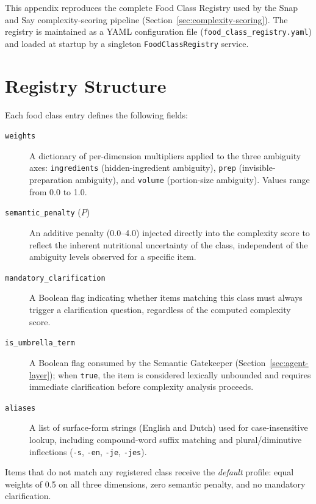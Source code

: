 \label{app:food-class-registry}

This appendix reproduces the complete Food Class Registry used by the Snap and Say complexity-scoring pipeline (Section~\ref{sec:complexity-scoring}). The registry is maintained as a YAML configuration file (\texttt{food\_class\_registry.yaml}) and loaded at startup by a singleton \texttt{FoodClassRegistry} service.

\section*{Registry Structure}

Each food class entry defines the following fields:

\begin{description}
    \item[\texttt{weights}] A dictionary of per-dimension multipliers applied to the three ambiguity axes: \texttt{ingredients} (hidden-ingredient ambiguity), \texttt{prep} (invisible-preparation ambiguity), and \texttt{volume} (portion-size ambiguity). Values range from 0.0 to 1.0.
    \item[\texttt{semantic\_penalty} ($P$)] An additive penalty (0.0--4.0) injected directly into the complexity score to reflect the inherent nutritional uncertainty of the class, independent of the ambiguity levels observed for a specific item.
    \item[\texttt{mandatory\_clarification}] A Boolean flag indicating whether items matching this class must always trigger a clarification question, regardless of the computed complexity score.
    \item[\texttt{is\_umbrella\_term}] A Boolean flag consumed by the Semantic Gatekeeper (Section~\ref{sec:agent-layer}); when \texttt{true}, the item is considered lexically unbounded and requires immediate clarification before complexity analysis proceeds.
    \item[\texttt{aliases}] A list of surface-form strings (English and Dutch) used for case-insensitive lookup, including compound-word suffix matching and plural/diminutive inflections (\texttt{-s}, \texttt{-en}, \texttt{-je}, \texttt{-jes}).
\end{description}

Items that do not match any registered class receive the \emph{default} profile: equal weights of 0.5 on all three dimensions, zero semantic penalty, and no mandatory clarification.

